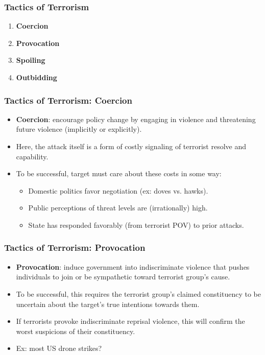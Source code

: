 \documentclass[handout]{beamer}
\begin{document}
\begin{frame} 
	\frametitle{\LARGE{Tactics of Terrorism}}
	\begin{enumerate}
		\item \textbf{Coercion}
		
		\item \textbf{Provocation}
		
		\item \textbf{Spoiling} 
		
		\item \textbf{Outbidding}
	\end{enumerate}
\end{frame}

\begin{frame} 
\frametitle{\LARGE{Tactics of Terrorism: Coercion}}
\begin{itemize}
		\item \textbf{Coercion}: encourage policy change by engaging in violence and threatening future violence (implicitly or explicitly). \pause 
		\item Here, the attack itself is a form of costly signaling of terrorist resolve and capability. \pause
		\item To be successful, target must care about these costs in some way: \pause
		\begin{itemize}
			\item Domestic politics favor negotiation (ex: doves vs. hawks). \pause
			\item Public perceptions of threat levels are (irrationally) high. \pause
			\item State has responded favorably (from terrorist POV) to prior attacks.
		\end{itemize}

		
\end{itemize}
\end{frame}

\begin{frame} 
	\frametitle{\LARGE{Tactics of Terrorism: Provocation}}
	\begin{itemize}
		\item \textbf{Provocation}: induce government into indiscriminate violence that pushes individuals to join or be sympathetic toward terrorist group's cause. \pause
		\item To be successful, this requires the terrorist group's claimed constituency to be uncertain about the target's true intentions towards them. \pause
		\item If terrorists provoke indiscriminate reprisal violence, this will confirm the worst suspicions of their constituency.
		\item Ex: most US drone strikes?
	\end{itemize}
\end{frame}
\end{document}

